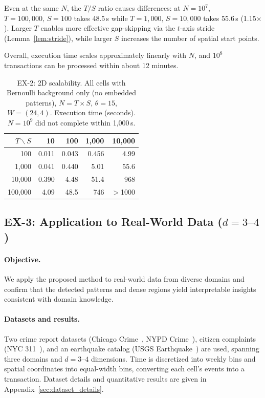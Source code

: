 Even at the same $N$, the $T/S$ ratio causes differences:
at $N = 10^7$, $T{=}100{,}000,\, S{=}100$ takes 48.5\,s
while $T{=}1{,}000,\, S{=}10{,}000$ takes 55.6\,s (1.15$\times$).
Larger $T$ enables more effective gap-skipping via the $t$-axis stride
(Lemma~\ref{lem:stride}),
while larger $S$ increases the number of spatial start points.

Overall, execution time scales approximately linearly with $N$,
and $10^8$ transactions can be processed within about 12 minutes.

\begin{table}[t]
\centering
\caption{EX-2: 2D scalability.
  All cells with Bernoulli background only (no embedded patterns),
  $N = T \times S$, $\theta = 15$, $W = (24, 4)$.
  Execution time (seconds). $N = 10^9$ did not complete within 1{,}000\,s.}
\label{tab:ex2_grid}
\small
\begin{tabular}{r|rrrr}
\toprule
$T \backslash S$ & 10 & 100 & 1{,}000 & 10{,}000 \\
\midrule
      100 & 0.011 &  0.043 &  0.456 &  4.99 \\
  1{,}000 &  0.041 &  0.440 &  5.01 &  55.6 \\
 10{,}000 &  0.390 &  4.48 &  51.4 &  968 \\
100{,}000 &  4.09 &  48.5 &  746 &     $>$1000 \\
\bottomrule
\end{tabular}
\end{table}

\subsection{EX-3: Application to Real-World Data ($d{=}3$--$4$)}
\label{sec:ex3}

\paragraph{Objective.}
We apply the proposed method to real-world data from diverse domains
and confirm that the detected patterns and dense regions
yield interpretable insights consistent with domain knowledge.

\paragraph{Datasets and results.}
Two crime report datasets
(Chicago Crime~\cite{chicagocrime}, NYPD Crime~\cite{nypdcrime}),
citizen complaints (NYC 311~\cite{nyc311}),
and an earthquake catalog (USGS Earthquake~\cite{usgseq})
are used, spanning three domains and $d{=}3$--$4$ dimensions.
Time is discretized into weekly bins and spatial coordinates
into equal-width bins, converting each cell's events into a transaction.
Dataset details and quantitative results
are given in Appendix~\ref{sec:dataset_details}.

